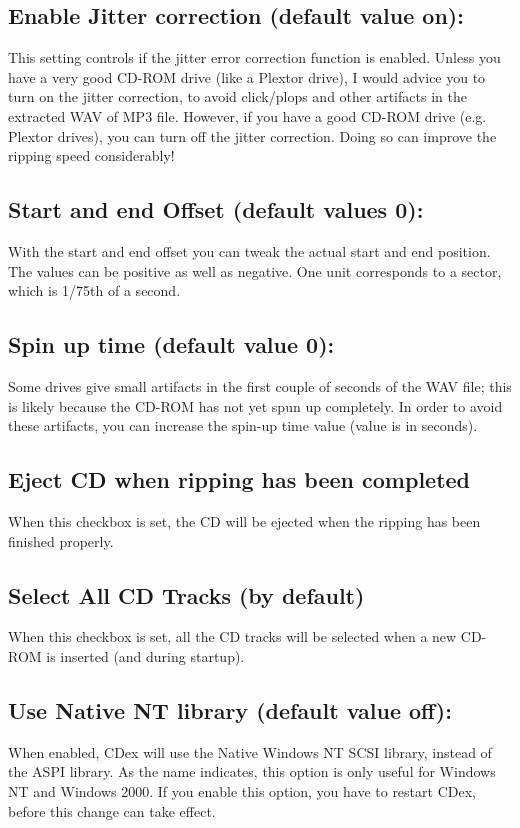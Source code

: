 \subsection{Enable Jitter correction (default value on):}

This setting controls if the jitter error correction function is enabled.
Unless you have a very good CD-ROM drive (like a Plextor drive), I would advice you 
to turn on the jitter correction, to avoid click/plops and other artifacts in the 
extracted WAV of MP3 file. However, if you have a good CD-ROM drive (e.g. Plextor drives),
you can turn off the jitter correction. Doing so can improve the ripping speed considerably!


\subsection{Start and end Offset (default values 0):}

With the start and end offset you can tweak the actual start and end position.
The values can be positive as well as negative. One unit corresponds to a
sector, which is 1/75th of a second.

\subsection{Spin up time (default value 0):}

Some drives give small artifacts in the first couple of seconds of the WAV
file; this is likely because the CD-ROM has not yet spun up completely. In order	
to avoid these artifacts, you can increase the spin-up time value
(value is in seconds).

\subsection{Eject CD when ripping has been completed}
When this checkbox is set, the CD will be ejected when the ripping has been 
finished properly.

\subsection{Select All CD Tracks (by default)}
When this checkbox is set, all the CD tracks will be selected when a new CD-ROM
is inserted (and during startup).

\subsection{Use Native NT library (default value off):}
When enabled, CDex will use the Native Windows NT SCSI library, instead of the 
ASPI library. As the name indicates, this option is only useful for Windows NT and Windows 2000.
If you enable this option, you have to restart CDex, before this change can take effect.

